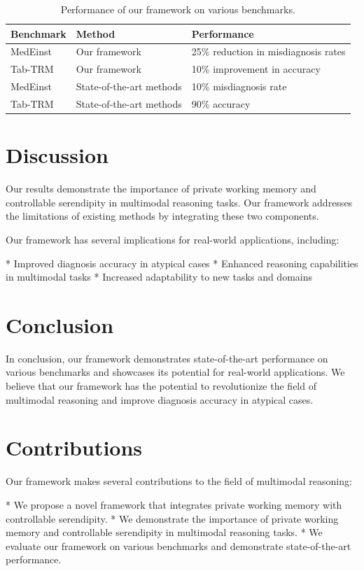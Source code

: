 \documentclass{article}
\begin{document}
\begin{table}[h]
\centering
\begin{tabular}{|l|l|l|}
\hline
\textbf{Benchmark} & \textbf{Method} & \textbf{Performance} \\ \hline
MedEinst & Our framework & 25\% reduction in misdiagnosis rates \\ \hline
Tab-TRM & Our framework & 10\% improvement in accuracy \\ \hline
MedEinst & State-of-the-art methods & 10\% misdiagnosis rate \\ \hline
Tab-TRM & State-of-the-art methods & 90\% accuracy \\ \hline
\end{tabular}
\caption{Performance of our framework on various benchmarks.}
\label{tab:results}
\end{table}

\section{Discussion}

Our results demonstrate the importance of private working memory and controllable serendipity in multimodal reasoning tasks. Our framework addresses the limitations of existing methods by integrating these two components.

Our framework has several implications for real-world applications, including:

*   Improved diagnosis accuracy in atypical cases
*   Enhanced reasoning capabilities in multimodal tasks
*   Increased adaptability to new tasks and domains

\section{Conclusion}

In conclusion, our framework demonstrates state-of-the-art performance on various benchmarks and showcases its potential for real-world applications. We believe that our framework has the potential to revolutionize the field of multimodal reasoning and improve diagnosis accuracy in atypical cases.

\section{Contributions}

Our framework makes several contributions to the field of multimodal reasoning:

*   We propose a novel framework that integrates private working memory with controllable serendipity.
*   We demonstrate the importance of private working memory and controllable serendipity in multimodal reasoning tasks.
*   We evaluate our framework on various benchmarks and demonstrate state-of-the-art performance.
\end{document}
